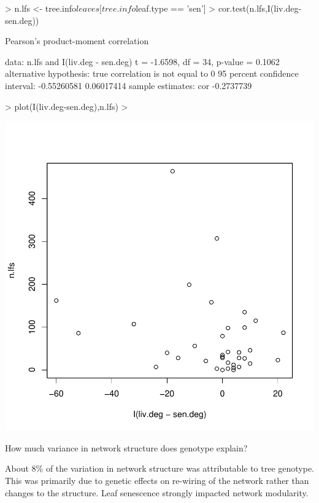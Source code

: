 \documentclass[12pt]{article}
\begin{document}
\begin{Schunk}
\begin{Sinput}
> n.lfs <- tree.info$leaves[tree.info$leaf.type == 'sen']
> cor.test(n.lfs,I(liv.deg-sen.deg))
\end{Sinput}
\begin{Soutput}
	Pearson's product-moment correlation

data:  n.lfs and I(liv.deg - sen.deg)
t = -1.6598, df = 34, p-value = 0.1062
alternative hypothesis: true correlation is not equal to 0
95 percent confidence interval:
 -0.55260581  0.06017414
sample estimates:
       cor 
-0.2737739 
\end{Soutput}
\begin{Sinput}
> plot(I(liv.deg-sen.deg),n.lfs)
> 
\end{Sinput}
\end{Schunk}
\includegraphics{notebook-005}

How much variance in network structure does genotype explain?

About 8\% of the variation in network structure was attributable to
tree genotype. This was primarily due to genetic effects on re-wiring of the network rather than changes to the structure. Leaf senescence strongly impacted network modularity. 
\end{document}
